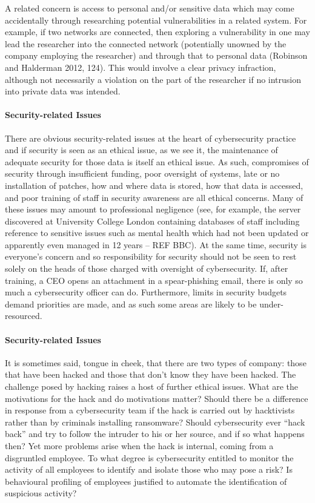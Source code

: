 \documentclass{svjour3}                     %
\begin{document}
A related concern is access to personal and/or sensitive data which may come accidentally through researching potential vulnerabilities in a related system. For example, if two networks are connected, then exploring a vulnerability in one may lead the researcher into the connected network (potentially unowned by the company employing the researcher) and through that to personal data (Robinson and Halderman 2012, 124). This would involve a clear privacy infraction, although not necessarily a violation on the part of the researcher if no intrusion into private data was intended.

\paragraph{Security-related Issues}
There are obvious security-related issues at the heart of cybersecurity practice and if security is seen as an ethical issue, as we see it, the maintenance of adequate security for those data is itself an ethical issue. As such, compromises of security through insufficient funding, poor oversight of systems, late or no installation of patches, how and where data is stored, how that data is accessed, and poor training of staff in security awareness are all ethical concerns. Many of these issues may amount to professional negligence (see, for example, the server discovered at University College London containing databases of staff including reference to sensitive issues such as mental health which had not been updated or apparently even managed in 12 years – REF BBC). At the same time, security is everyone’s concern and so responsibility for security should not be seen to rest solely on the heads of those charged with oversight of cybersecurity. If, after training, a CEO opens an attachment in a spear-phishing email, there is only so much a cybersecurity officer can do. Furthermore, limits in security budgets demand priorities are made, and as such some areas are likely to be under-resourced.

\paragraph{Security-related Issues}
It is sometimes said, tongue in cheek, that there are two types of company: those that have been hacked and those that don’t know they have been hacked. The challenge posed by hacking raises a host of further ethical issues. What are the motivations for the hack and do motivations matter? Should there be a difference in response from a cybersecurity team if the hack is carried out by hacktivists rather than by criminals installing ransomware? Should cybersecurity ever “hack back” and try to follow the intruder to his or her source, and if so what happens then? Yet more problems arise when the hack is internal, coming from a disgruntled employee. To what degree is cybersecurity entitled to monitor the activity of all employees to identify and isolate those who may pose a risk? Is behavioural profiling of employees justified to automate the identification of suspicious activity? 
\end{document}
